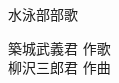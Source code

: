 \documentclass[10pt,b5j]{tarticle} %
\begin{document}
\begin{minipage}[c]{0.7\hsize} %
    \begin{center}
        {\LARGE
            水泳部部歌 %
        }
        {\small 
        }
    \end{center}
\end{minipage}
\begin{minipage}[c]{0.3\hsize} %
    \begin{flushright} %
        築城武義君 作歌\\柳沢三郎君 作曲 %
    \end{flushright}
\end{minipage}
\end{document}
